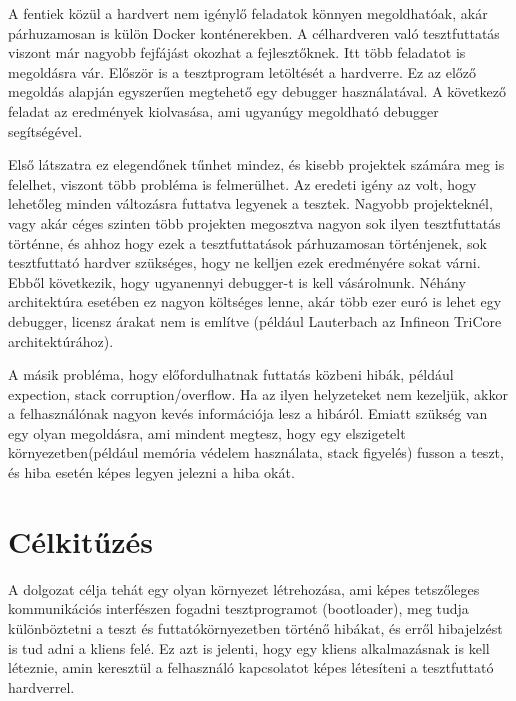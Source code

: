 A fentiek közül a hardvert nem igénylő feladatok könnyen megoldhatóak, akár párhuzamosan is külön Docker konténerekben. A célhardveren való tesztfuttatás viszont már nagyobb fejfájást okozhat a fejlesztőknek. Itt több feladatot is megoldásra vár. Először is a tesztprogram letöltését a hardverre. Ez az előző megoldás alapján egyszerűen megtehető egy debugger használatával. A következő feladat az eredmények kiolvasása, ami ugyanúgy megoldható debugger segítségével. 

Első látszatra ez elegendőnek tűnhet mindez, és kisebb projektek számára meg is felelhet, viszont több probléma is felmerülhet. Az eredeti igény az volt, hogy lehetőleg minden változásra futtatva legyenek a tesztek. Nagyobb projekteknél, vagy akár céges szinten több projekten megosztva nagyon sok ilyen tesztfuttatás történne, és ahhoz hogy ezek a tesztfuttatások párhuzamosan történjenek, sok tesztfuttató hardver szükséges, hogy ne kelljen ezek eredményére sokat várni. Ebből következik, hogy ugyanennyi debugger-t is kell vásárolnunk. Néhány architektúra esetében ez nagyon költséges lenne, akár több ezer euró is lehet egy debugger, licensz árakat nem is említve (például Lauterbach az Infineon TriCore architektúrához).

A másik probléma, hogy előfordulhatnak futtatás közbeni hibák, például expection, stack corruption/overflow. Ha az ilyen helyzeteket nem kezeljük, akkor a felhasználónak nagyon kevés információja lesz a hibáról. Emiatt szükség van egy olyan megoldásra, ami mindent megtesz, hogy egy elszigetelt környezetben(például memória védelem használata, stack figyelés) fusson a teszt, és hiba esetén képes legyen jelezni a hiba okát.

\section*{Célkitűzés}

A dolgozat célja tehát egy olyan környezet létrehozása, ami képes tetszőleges kommunikációs interfészen fogadni tesztprogramot (bootloader), meg tudja különböztetni a teszt és futtatókörnyezetben történő hibákat, és erről hibajelzést is tud adni a kliens felé. Ez azt is jelenti, hogy egy kliens alkalmazásnak is kell léteznie, amin keresztül a felhasználó kapcsolatot képes létesíteni a tesztfuttató hardverrel.